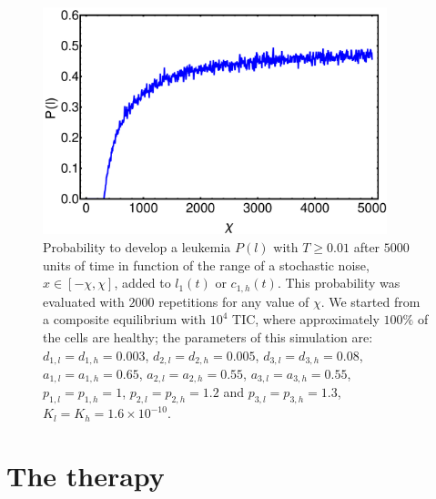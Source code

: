 \documentclass[a4paper,10pt]{article}
\begin{document}
\begin{figure}
\centering
\includegraphics[width=10cm] {leucemia-e-fluttuazioni.pdf}
\caption{Probability to develop a leukemia $P(l)$ with $T\geq0.01$ after
$5000$ units of time in function of the range of a stochastic noise, $x\in[-\chi,\chi]$,
added to $l_{1}(t)$ or $c_{1,h}(t)$. This probability was evaluated with $2000$ repetitions for any value of $\chi$.
We started from a composite equilibrium with $10^4$ TIC, where approximately $ 100\%$ of the
cells are healthy;
the parameters of this simulation are: 
$d_{1,l}=d_{1,h}=0.003$, $d_{2,l}=d_{2,h}=0.005$,
$d_{3,l}=d_{3,h}=0.08$, $a_{1,l}=a_{1,h}=0.65$, $a_{2,l}=a_{2,h}=0.55$, 
$a_{3,l}=a_{3,h}=0.55$, $p_{1,l}=p_{1,h}=1$, $p_{2,l}=p_{2,h}=1.2$ and
$p_{3,l}=p_{3,h}=1.3$, $K_{l}=K_{h}=1.6\times 10^{-10}$.\\
}
\label{fig:P-fluctuations}
\end{figure}

\section{The therapy}

\FloatBarrier
\end{document}
